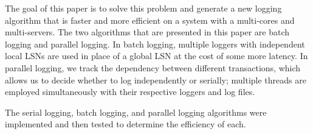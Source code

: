 The goal of this paper is to solve this problem and generate a new logging algorithm that is faster and more efficient on a system with a multi-cores and multi-servers. The two algorithms that are presented in this paper are batch logging and parallel logging. In batch logging, multiple loggers with independent local LSNs are used in place of a global LSN at the cost of some more latency. In parallel logging, we track the dependency between different transactions, which allows us to decide whether to log  independently or serially; multiple threads are employed simultaneously with their respective loggers and log files. \newline

The serial logging, batch logging, and parallel logging algorithms were implemented and then tested to determine the efficiency of each. \par
